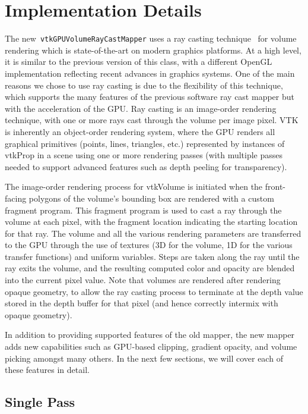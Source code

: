 \section{Implementation Details}
\label{implementationdetails}
The new~\texttt{vtkGPUVolumeRayCastMapper} uses a ray casting
technique~\citep{engel_real-time_2006} for volume rendering which is
state-of-the-art on modern graphics platforms. At a high level, it is similar to
the previous version of this class, with a different OpenGL implementation
reflecting recent advances in graphics systems. One of the main reasons we chose
to use ray casting is due to the flexibility of this technique, which supports the
many features of the previous software ray cast mapper but with the acceleration
of the GPU. Ray casting is an image-order rendering technique, with one or more
rays cast through the volume per image pixel. VTK is inherently an object-order
rendering system, where the GPU renders all graphical primitives (points, lines,
triangles, etc.) represented by instances of vtkProp in a scene using one or
more rendering passes (with multiple passes needed to support advanced features
such as depth peeling for transparency).

The image-order rendering process for vtkVolume is initiated when the
front-facing polygons of the volume’s bounding box are rendered with a custom
fragment program. This fragment program is used to cast a ray through the volume
at each pixel, with the fragment location indicating the starting location for
that ray. The volume and all the various rendering parameters are transferred to
the GPU through the use of textures (3D for the volume, 1D for the various
transfer functions) and uniform variables. Steps are taken along the ray until
the ray exits the volume, and the resulting computed color and opacity are
blended into the current pixel value. Note that volumes are rendered after rendering opaque geometry, to allow the ray casting process to terminate at
the depth value stored in the depth buffer for that pixel (and hence correctly
intermix with opaque geometry).

In addition to providing supported features of the old mapper, the new mapper
adds new capabilities such as GPU-based clipping,  gradient opacity, and volume
picking amongst many others. In the next few sections, we will cover each of
these features in detail.

\subsection{Single Pass}


